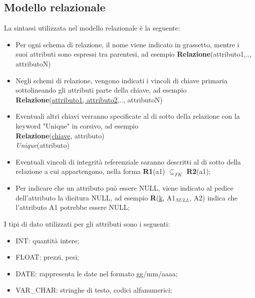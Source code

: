 \documentclass[a4paper,12pt]{article}
\begin{document}
\subsection{Modello relazionale}
La sintassi utilizzata nel modello relazionale è la seguente:
\begin{itemize}
  \item Per ogni schema di relazione, il nome viene indicato in grassetto, mentre i suoi attributi sono espressi tra parentesi, ad esempio \textbf{Relazione}(attributo1,.., attributoN)
  \item Negli schemi di relazione, vengono indicati i vincoli di chiave primaria sottolineando gli attributi parte della chiave, ad esempio \textbf{Relazione}(\underline{attributo1, attributo2},.., attributoN)
  \item Eventuali altri chiavi verranno specificate al di sotto della relazione con la keyword "Unique" in corsivo, ad esempio \\ \textbf{Relazione}(\underline{chiave}, attributo)\\ \textit{Unique}(attributo)
  \item Eventuali vincoli di integrità referenziale saranno descritti al di sotto della relazione a cui appartengono, nella forma \textbf{R1}(a1) $\subseteq _{FK}$ \textbf{R2}(a1);
  \item Per indicare che un attributo può essere NULL, viene indicato al pedice dell'attributo la dicitura NULL, ad esempio \textbf{R}(\underline{k}, A1$_{NULL}$, A2) indica che l'attributo A1 potrebbe essere NULL;
\end{itemize}

I tipi di dato utilizzati per gli attributi sono i seguenti:
\begin{itemize}
  \item INT: quantità intere;
  \item FLOAT: prezzi, pesi;
  \item DATE: rappresenta le date nel formato gg/mm/aaaa;
  \item VAR\_CHAR: stringhe di testo, codici alfanumerici;
\end{itemize}
\end{document}
